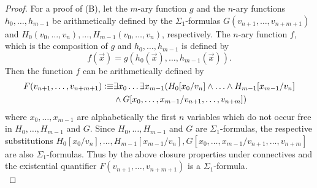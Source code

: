 \begin{proof}
For a proof of (B), let the $m$-ary function $g$ and the $n$-ary functions $h_0, \ldots, h_{m-1}$ be arithmetically defined by the $\Sigma_1$-formulas $G(v_{n+1}, \ldots, v_{n+m+1})$ and $H_0(v_0, \ldots, v_{n}), \ldots,H_{m-1}(v_0, \ldots, v_{n})$, respectively. The $n$-ary function $f$,  which is the composition of $g$ and $h_0, \ldots, h_{m-1}$ is defined by
\[f(\overrightarrow{x}) = g(h_0(\overrightarrow{x}), \ldots, h_{m-1}(\overrightarrow{x})).\] Then the function $f$ can be arithmetically defined by 
\begin{align*}
F(v_{n+1},\ldots, v_{n+m+1}) \vcentcolon \equiv & \exists x_{0} \ldots \exists x_{m-1}  (H_0 [x_0/v_{n}] \wedge \ldots \wedge H_{m-1} [x_{m-1}/v_{n}] \\
&  \wedge  G[x_0, \ldots,  x_{m-1}/v_{n+1}, \ldots, v_{n+m}])
\end{align*}
where $x_0, \ldots, x_{m-1}$ are alphabetically the first $n$ variables which do not occur free in $H_0, \ldots, H_{m-1}$ and $G$. Since $H_0, \ldots, H_{m-1}$ and $G$ are $\Sigma_1$-formulas, the respective substitutions $H_0 [x_0/v_{n}], \ldots ,H_{m-1} [x_{m-1}/v_{n}], G[x_0, \ldots,  x_{m-1}/v_{n+1}, \ldots, v_{n+m}]$ are also $\Sigma_1$-formulas. Thus by the above closure properties under connectives and the existential quantifier $F(v_{n+1},\ldots, v_{n+m+1})$ is a $\Sigma_1$-formula.
\\


\end{proof}
